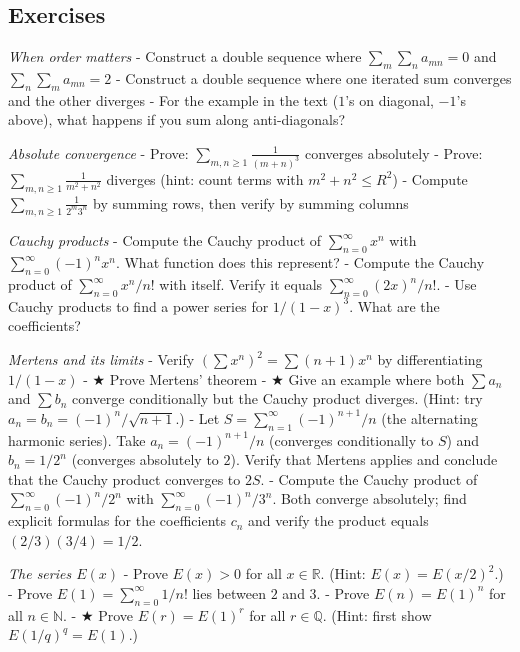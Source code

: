 \documentclass[
  10pt,
  letterpaper,
]{scrbook}
\begin{document}
\subsection{Exercises}\label{exercises-22}

\emph{When order matters} - Construct a double sequence where
\(\sum_m \sum_n a_{mn} = 0\) and \(\sum_n \sum_m a_{mn} = 2\) -
Construct a double sequence where one iterated sum converges and the
other diverges - For the example in the text (\(1\)'s on diagonal,
\(-1\)'s above), what happens if you sum along anti-diagonals?

\emph{Absolute convergence} - Prove:
\(\sum_{m,n \geq 1} \frac{1}{(m+n)^3}\) converges absolutely - Prove:
\(\sum_{m,n \geq 1} \frac{1}{m^2 + n^2}\) diverges (hint: count terms
with \(m^2 + n^2 \leq R^2\)) - Compute
\(\sum_{m,n \geq 1} \frac{1}{2^m 3^n}\) by summing rows, then verify by
summing columns

\emph{Cauchy products} - Compute the Cauchy product of
\(\sum_{n=0}^{\infty} x^n\) with \(\sum_{n=0}^{\infty} (-1)^n x^n\).
What function does this represent? - Compute the Cauchy product of
\(\sum_{n=0}^{\infty} x^n/n!\) with itself. Verify it equals
\(\sum_{n=0}^{\infty} (2x)^n/n!\). - Use Cauchy products to find a power
series for \(1/(1-x)^3\). What are the coefficients?

\emph{Mertens and its limits} - Verify \((\sum x^n)^2 = \sum (n+1)x^n\)
by differentiating \(1/(1-x)\) - ★ Prove Mertens' theorem - ★ Give an
example where both \(\sum a_n\) and \(\sum b_n\) converge conditionally
but the Cauchy product diverges. (Hint: try
\(a_n = b_n = (-1)^n/\sqrt{n+1}\).) - Let
\(S = \sum_{n=1}^{\infty} (-1)^{n+1}/n\) (the alternating harmonic
series). Take \(a_n = (-1)^{n+1}/n\) (converges conditionally to \(S\))
and \(b_n = 1/2^n\) (converges absolutely to \(2\)). Verify that Mertens
applies and conclude that the Cauchy product converges to \(2S\). -
Compute the Cauchy product of \(\sum_{n=0}^{\infty} (-1)^n/2^n\) with
\(\sum_{n=0}^{\infty} (-1)^n/3^n\). Both converge absolutely; find
explicit formulas for the coefficients \(c_n\) and verify the product
equals \((2/3)(3/4) = 1/2\).

\emph{The series \(E(x)\)} - Prove \(E(x) > 0\) for all
\(x \in \mathbb{R}\). (Hint: \(E(x) = E(x/2)^2\).) - Prove
\(E(1) = \sum_{n=0}^{\infty} 1/n!\) lies between \(2\) and \(3\). -
Prove \(E(n) = E(1)^n\) for all \(n \in \mathbb{N}\). - ★ Prove
\(E(r) = E(1)^r\) for all \(r \in \mathbb{Q}\). (Hint: first show
\(E(1/q)^q = E(1)\).)
\end{document}
